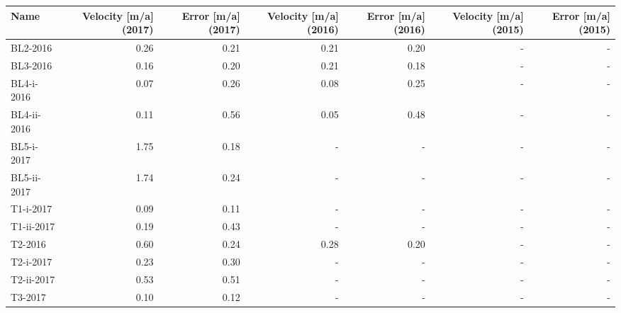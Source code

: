 \begin{tabular}{lrrrrrr}
\toprule
        Name &  Velocity [m/a] (2017) &  Error [m/a] (2017) &  Velocity [m/a] (2016) &  Error [m/a] (2016) &  Velocity [m/a] (2015) &  Error [m/a] (2015) \\
\midrule
    BL2-2016 &                   0.26 &                0.21 &                   0.21 &                0.20 &                      - &                   - \\
    BL3-2016 &                   0.16 &                0.20 &                   0.21 &                0.18 &                      - &                   - \\
  BL4-i-2016 &                   0.07 &                0.26 &                   0.08 &                0.25 &                      - &                   - \\
 BL4-ii-2016 &                   0.11 &                0.56 &                   0.05 &                0.48 &                      - &                   - \\
  BL5-i-2017 &                   1.75 &                0.18 &                      - &                   - &                      - &                   - \\
 BL5-ii-2017 &                   1.74 &                0.24 &                      - &                   - &                      - &                   - \\
   T1-i-2017 &                   0.09 &                0.11 &                      - &                   - &                      - &                   - \\
  T1-ii-2017 &                   0.19 &                0.43 &                      - &                   - &                      - &                   - \\
     T2-2016 &                   0.60 &                0.24 &                   0.28 &                0.20 &                      - &                   - \\
   T2-i-2017 &                   0.23 &                0.30 &                      - &                   - &                      - &                   - \\
  T2-ii-2017 &                   0.53 &                0.51 &                      - &                   - &                      - &                   - \\
     T3-2017 &                   0.10 &                0.12 &                      - &                   - &                      - &                   - \\

\end{tabular}
